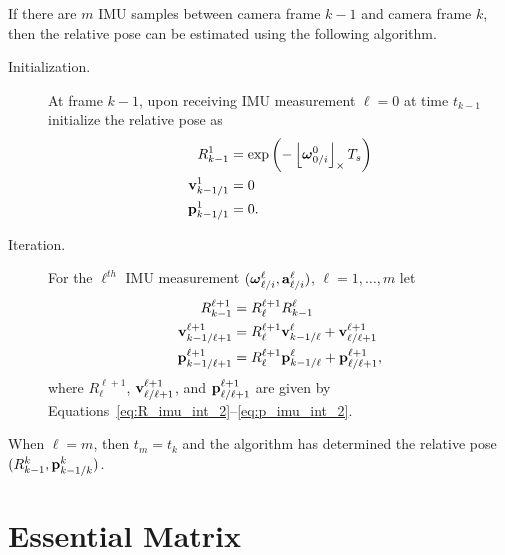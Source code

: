 If there are $m$ IMU samples between camera frame $k-1$ and camera frame $k$, then the relative pose can be estimated using the following algorithm.
\begin{description}
	\item[Initialization.] At frame $k-1$, upon receiving IMU measurement $\ell=0$ at time $t_{k-1}$ initialize the relative pose as
	\begin{align*}
	R_{k-1}^1 &= \exp\left(-\left\lfloor\boldsymbol{\omega}_{0/i}^0\right\rfloor_{\times}T_s\right) \\
	\mathbf{v}_{k-1/1}^1 &= 0 \\
	\mathbf{p}_{k-1/1}^1 &= 0.
	\end{align*}
	\item[Iteration.] For the $\ell^{th}$ IMU measurement $(\boldsymbol{\omega}_{\ell/i}^\ell, \mathbf{a}_{\ell/i}^\ell)$, $\ell=1,\dots,m$ let 
	\begin{align*}
	R_{k-1}^{\ell+1} &= R_\ell^{\ell+1} R_{k-1}^{\ell} \\
	\mathbf{v}_{k-1/\ell+1}^{\ell+1} &=  R_{\ell}^{\ell+1}\mathbf{v}_{k-1/\ell}^{\ell} + \mathbf{v}_{\ell/\ell+1}^{\ell+1} \\
	\mathbf{p}_{k-1/\ell+1}^{\ell+1} &= R_{\ell}^{\ell+1}\mathbf{p}_{k-1/\ell}^{\ell} + \mathbf{p}_{\ell/\ell+1}^{\ell+1},
	\end{align*} 
	where $R_{\ell}^{\ell+1}$, $\mathbf{v}_{\ell/\ell+1}^{\ell+1}$, and $\mathbf{p}_{\ell/\ell+1}^{\ell+1}$ are given by Equations~\eqref{eq:R_imu_int_2}--\eqref{eq:p_imu_int_2}.
\end{description}
When $\ell=m$, then $t_m=t_k$ and the algorithm has determined the relative pose $(R_{k-1}^k, \mathbf{p}_{k-1/k}^k)$.



\section{Essential Matrix}
\label{sec:essential_matrix}
%

